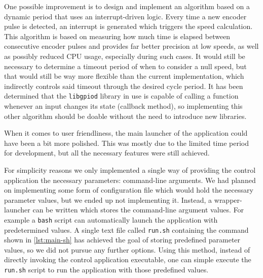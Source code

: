One possible improvement is to design and implement an algorithm based on a dynamic period that uses an interrupt-driven logic.
Every time a new encoder pulse is detected, an interrupt is generated which triggers the speed calculation.
This algorithm is based on measuring how much time is elapsed between consecutive encoder pulses and provides far better precision at low speeds, as well as possibly reduced CPU usage, especially during such cases.
It would still be necessary to determine a timeout period of when to consider a null speed, but that would still be way more flexible than the current implementation, which indirectly controls said timeout through the desired cycle period.
It has been determined that the \verb|libgpiod| library in use is capable of calling a function whenever an input changes its state (callback method), so implementing this other algorithm should be doable without the need to introduce new libraries.

When it comes to user friendliness, the main launcher of the application could have been a bit more polished.
This was mostly due to the limited time period for development, but all the necessary features were still achieved.

For simplicity reasons we only implemented a single way of providing the control application the necessary parameters: command-line arguments.
We had planned on implementing some form of configuration file which would hold the necessary parameter values, but we ended up not implementing it.
Instead, a wrapper-launcher can be written which stores the command-line argument values. For example a \verb|bash| script can automatically launch the application with predetermined values.
A single text file called \verb|run.sh| containing the command shown in \autoref{lst:main-sh} has achieved the goal of storing predefined parameter values, so we did not pursue any further options.
Using this method, instead of directly invoking the control application executable, one can simple execute the \verb|run.sh| script to run the application with those predefined values.


